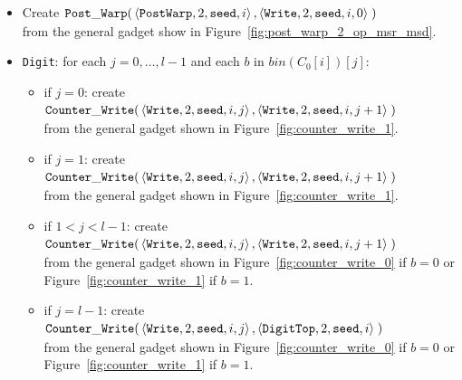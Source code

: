 \begin{itemize}
    \item Create
    $\begin{aligned}[t]
        {\tt Post\_Warp}(&\left\langle {\tt PostWarp}, 2, {\tt seed}, i    \right\rangle,
                   \left\langle {\tt Write},    2, {\tt seed}, i, 0 \right\rangle \;)
    \end{aligned}$\\ from the general gadget show in Figure~\ref{fig:post_warp_2_op_msr_msd}.


    \item {\tt Digit}: for each $j=0,\ldots,l-1$ and each $b$ in $bin(C_0[i])[j]$:
    \begin{itemize}
        \item if $j = 0$: create
        $\begin{aligned}[t]
            {\tt Counter\_Write}(&\left\langle {\tt Write}, 2, {\tt seed}, i, j \right\rangle, \left\langle {\tt Write}, 2, {\tt seed}, i, j + 1 \right\rangle \;)
        \end{aligned}$\\from the general gadget shown in Figure~\ref{fig:counter_write_1}.

        \item if $j = 1$: create
        $\begin{aligned}[t]
            {\tt Counter\_Write}(&\left\langle {\tt Write}, 2, {\tt seed}, i, j \right\rangle, \left\langle {\tt Write}, 2, {\tt seed}, i, j + 1 \right\rangle \;)
        \end{aligned}$\\from the general gadget shown in Figure~\ref{fig:counter_write_1}.

        \item if $1 < j < l-1$: create
        $\begin{aligned}[t]
            {\tt Counter\_Write}(&\left\langle {\tt Write}, 2, {\tt seed}, i, j \right\rangle, \left\langle {\tt Write}, 2, {\tt seed}, i, j + 1 \right\rangle \;)
        \end{aligned}$\\from the general gadget shown in Figure~\ref{fig:counter_write_0} if $b = 0$ or Figure~\ref{fig:counter_write_1} if $b = 1$.

        \item if $j = l-1$: create
        $\begin{aligned}[t]
            {\tt Counter\_Write}(&\left\langle {\tt Write}, 2, {\tt seed}, i, j \right\rangle, \left\langle {\tt DigitTop}, 2, {\tt seed}, i \right\rangle \;)
        \end{aligned}$\\from the general gadget shown in Figure~\ref{fig:counter_write_0} if $b = 0$ or Figure~\ref{fig:counter_write_1} if $b = 1$.
    \end{itemize}


\end{itemize}
